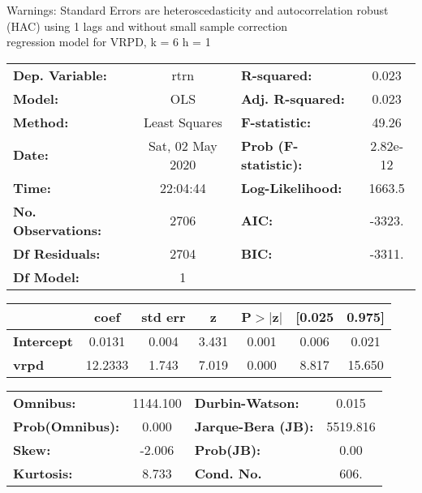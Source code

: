 Warnings: \newline
 [1] Standard Errors are heteroscedasticity and autocorrelation robust (HAC) using 1 lags and without small sample correction\\ 

regression model for VRPD, k = 6 h = 1\begin{center}
\begin{tabular}{lclc}
\toprule
\textbf{Dep. Variable:}    &       rtrn       & \textbf{  R-squared:         } &     0.023   \\
\textbf{Model:}            &       OLS        & \textbf{  Adj. R-squared:    } &     0.023   \\
\textbf{Method:}           &  Least Squares   & \textbf{  F-statistic:       } &     49.26   \\
\textbf{Date:}             & Sat, 02 May 2020 & \textbf{  Prob (F-statistic):} &  2.82e-12   \\
\textbf{Time:}             &     22:04:44     & \textbf{  Log-Likelihood:    } &    1663.5   \\
\textbf{No. Observations:} &        2706      & \textbf{  AIC:               } &    -3323.   \\
\textbf{Df Residuals:}     &        2704      & \textbf{  BIC:               } &    -3311.   \\
\textbf{Df Model:}         &           1      & \textbf{                     } &             \\
\bottomrule
\end{tabular}
\begin{tabular}{lcccccc}
                   & \textbf{coef} & \textbf{std err} & \textbf{z} & \textbf{P$> |$z$|$} & \textbf{[0.025} & \textbf{0.975]}  \\
\midrule
\textbf{Intercept} &       0.0131  &        0.004     &     3.431  &         0.001        &        0.006    &        0.021     \\
\textbf{vrpd}      &      12.2333  &        1.743     &     7.019  &         0.000        &        8.817    &       15.650     \\
\bottomrule
\end{tabular}
\begin{tabular}{lclc}
\textbf{Omnibus:}       & 1144.100 & \textbf{  Durbin-Watson:     } &    0.015  \\
\textbf{Prob(Omnibus):} &   0.000  & \textbf{  Jarque-Bera (JB):  } & 5519.816  \\
\textbf{Skew:}          &  -2.006  & \textbf{  Prob(JB):          } &     0.00  \\
\textbf{Kurtosis:}      &   8.733  & \textbf{  Cond. No.          } &     606.  \\
\bottomrule
\end{tabular}
\end{center}


